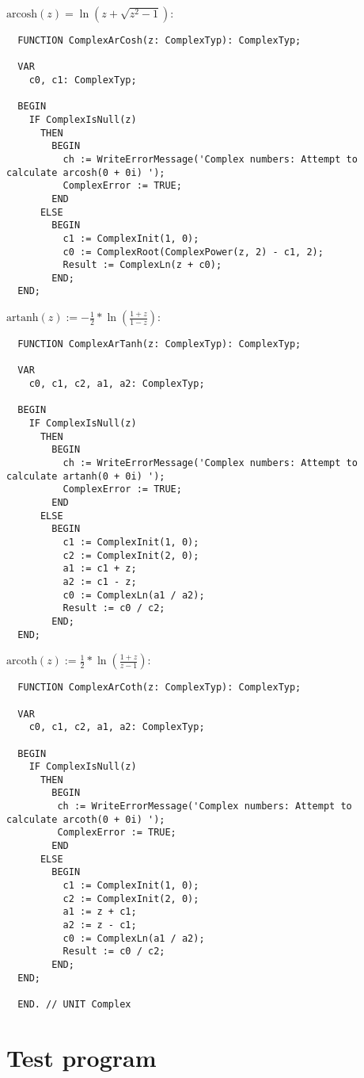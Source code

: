 \begin{refsection}
\( \mathrm{arcosh}(z) = \ln(z + \sqrt{z^2 - 1}) \):

\begin{lstlisting}
  FUNCTION ComplexArCosh(z: ComplexTyp): ComplexTyp;

  VAR
    c0, c1: ComplexTyp;

  BEGIN
    IF ComplexIsNull(z)
      THEN
        BEGIN
          ch := WriteErrorMessage('Complex numbers: Attempt to calculate arcosh(0 + 0i) ');
          ComplexError := TRUE;
        END
      ELSE
        BEGIN
          c1 := ComplexInit(1, 0);
          c0 := ComplexRoot(ComplexPower(z, 2) - c1, 2);
          Result := ComplexLn(z + c0);
        END;
  END;
\end{lstlisting}

\( \mathrm{artanh}(z) := -\frac{1}{2} * \ln(\frac{1 + z}{1 - z}) \):

\begin{lstlisting}
  FUNCTION ComplexArTanh(z: ComplexTyp): ComplexTyp;

  VAR
    c0, c1, c2, a1, a2: ComplexTyp;

  BEGIN
    IF ComplexIsNull(z)
      THEN
        BEGIN
          ch := WriteErrorMessage('Complex numbers: Attempt to calculate artanh(0 + 0i) ');
          ComplexError := TRUE;
        END
      ELSE
        BEGIN
          c1 := ComplexInit(1, 0);
          c2 := ComplexInit(2, 0);
          a1 := c1 + z;
          a2 := c1 - z;
          c0 := ComplexLn(a1 / a2);
          Result := c0 / c2;
        END;
  END;
\end{lstlisting}

\( \mathrm{arcoth}(z) := \frac{1}{2} * \ln(\frac{1 + z}{z - 1}) \):

\begin{lstlisting}
  FUNCTION ComplexArCoth(z: ComplexTyp): ComplexTyp;

  VAR
    c0, c1, c2, a1, a2: ComplexTyp;

  BEGIN
    IF ComplexIsNull(z)
      THEN
        BEGIN
         ch := WriteErrorMessage('Complex numbers: Attempt to calculate arcoth(0 + 0i) ');
         ComplexError := TRUE;
        END
      ELSE
        BEGIN
          c1 := ComplexInit(1, 0);
          c2 := ComplexInit(2, 0);
          a1 := z + c1;
          a2 := z - c1;
          c0 := ComplexLn(a1 / a2);
          Result := c0 / c2;
        END;
  END;

  END. // UNIT Complex
\end{lstlisting}

\section{Test program}


\end{refsection}

